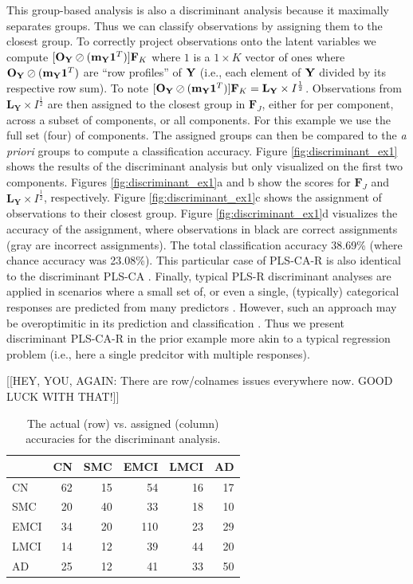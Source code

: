 \documentclass[12pt]{article}
\begin{document}
This group-based analysis is also a discriminant analysis because it
maximally separates groups. Thus we can classify observations by
assigning them to the closest group. To correctly project observations
onto the latent variables we compute
\([{\bf O}_{\bf Y} \oslash ({\bf m}_{\bf Y}{\bf 1}^T)]{\bf F}_{K}\)
where \(1\) is a \(1 \times K\) vector of ones where
\({\bf O}_{\bf Y} \oslash ({\bf m}_{\bf Y}{\bf 1}^T)\) are ``row
profiles'' of \({\bf Y}\) (i.e., each element of \({\bf Y}\) divided by
its respective row sum). To note
\([{\bf O}_{\bf Y} \oslash ({\bf m}_{\bf Y}{\bf 1}^T)]{\bf F}_{K} = {\mathbf L}_{\mathbf Y} \times I^{\frac{1}{2}}\).
Observations from \({\mathbf L}_{\mathbf Y} \times I^{\frac{1}{2}}\) are
then assigned to the closest group in \({\mathbf F}_{J}\), either for
per component, across a subset of components, or all components. For
this example we use the full set (four) of components. The assigned
groups can then be compared to the \emph{a priori} groups to compute a
classification accuracy. Figure \ref{fig:discriminant_ex1} shows the
results of the discriminant analysis but only visualized on the first
two components. Figures \ref{fig:discriminant_ex1}a and b show the
scores for \({\mathbf F}_{J}\) and
\({\mathbf L}_{\mathbf Y} \times I^{\frac{1}{2}}\), respectively. Figure
\ref{fig:discriminant_ex1}c shows the assignment of observations to
their closest group. Figure \ref{fig:discriminant_ex1}d visualizes the
accuracy of the assignment, where observations in black are correct
assignments (gray are incorrect assignments). The total classification
accuracy 38.69\% (where chance accuracy was 23.08\%). This particular
case of PLS-CA-R is also identical to the discriminant PLS-CA
\citep{beaton_partial_2016}. Finally, typical PLS-R discriminant
analyses are applied in scenarios where a small set of, or even a
single, (typically) categorical responses are predicted from many
predictors \citep{perez-enciso_prediction_2003}. However, such an
approach may be overoptimitic in its prediction and classification
\citep{rodriguez-perez_overoptimism_2018}. Thus we present discriminant
PLS-CA-R in the prior example more akin to a typical regression problem
(i.e., here a single predcitor with multiple responses).

{[}{[}HEY, YOU, AGAIN: There are row/colnames issues everywhere now.
GOOD LUCK WITH THAT!{]}{]}

\begin{table}[!h]

\caption{\label{tab:unnamed-chunk-7}\label{table:assign_ex1} The actual (row) vs. assigned (column) accuracies for the discriminant analysis.}
\centering
\begin{tabular}{lrrrrr}
\toprule
  & CN & SMC & EMCI & LMCI & AD\\
\midrule
CN & 62 & 15 & 54 & 16 & 17\\
SMC & 20 & 40 & 33 & 18 & 10\\
EMCI & 34 & 20 & 110 & 23 & 29\\
LMCI & 14 & 12 & 39 & 44 & 20\\
AD & 25 & 12 & 41 & 33 & 50\\
\bottomrule
\end{tabular}
\end{table}
\end{document}
